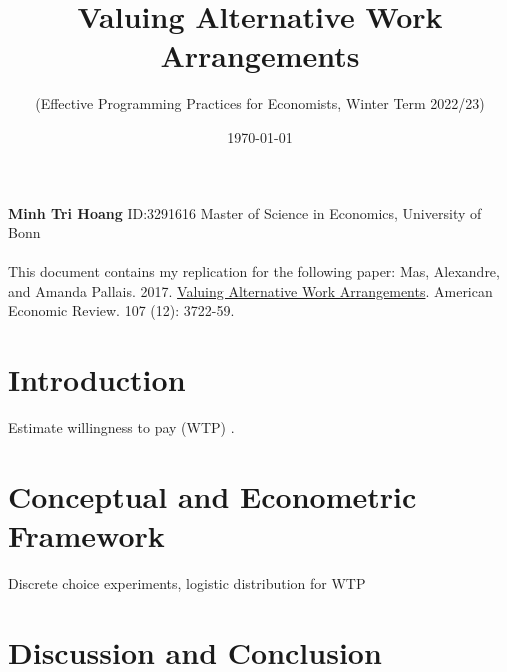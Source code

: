 \documentclass[11pt]{article}
\begin{document}
\title{\textbf{Valuing Alternative Work Arrangements}}
\author{(Effective Programming Practices for Economists, Winter Term 2022/23)}
\date{\today}

\maketitle
\textbf{Minh Tri Hoang} \textbar{} ID:3291616 \textbar{} Master of Science in Economics, University of Bonn \\ \\
This document contains my replication for the following paper: Mas, Alexandre, and Amanda Pallais. 2017. \href{https://www.aeaweb.org/articles?id=10.1257/aer.20161500}{Valuing Alternative Work Arrangements}. American Economic Review. 107 (12): 3722-59.

\tableofcontents

\pagebreak

\hypertarget{introduction}{%
\section{Introduction}\label{introduction}}

Estimate willingness to pay (WTP) \cite{10.1257/aer.20161500}.

\hypertarget{Conceptual and Econometric Framework}{%
\section{Conceptual and Econometric Framework}\label{Conceptual and Econometric Framework}}

Discrete choice experiments, logistic distribution for WTP

\hypertarget{Discussion and Conclusion}{%
\section{Discussion and Conclusion}\label{Discussion and Conclusion}}




\end{document}
